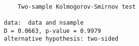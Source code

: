 \begin{verbatim} 

	Two-sample Kolmogorov-Smirnov test

data:  data and nsample
D = 0.0663, p-value = 0.9979
alternative hypothesis: two-sided

\end{verbatim}